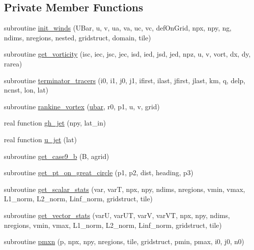 \subsection*{Private Member Functions}
\begin{DoxyCompactItemize}
\item 
subroutine \hyperlink{classtest__cases__mod_a6d5f8da880760736fb68b113be23efaf}{init\-\_\-winds} (U\-Bar, u, v, ua, va, uc, vc, def\-On\-Grid, npx, npy, ng, ndims, nregions, nested, gridstruct, domain, tile)
\item 
subroutine \hyperlink{classtest__cases__mod_afc2b5224f950494c9614172941aa7b6d}{get\-\_\-vorticity} (isc, iec, jsc, jec, isd, ied, jsd, jed, npz, u, v, vort, dx, dy, rarea)
\item 
subroutine \hyperlink{classtest__cases__mod_af4f0860ebee67f529c4151ae2957df42}{terminator\-\_\-tracers} (i0, i1, j0, j1, ifirst, ilast, jfirst, jlast, km, q, delp, ncnst, lon, lat)
\item 
subroutine \hyperlink{classtest__cases__mod_a6dea8865194b1c32a2d18f02b3c6533a}{rankine\-\_\-vortex} (\hyperlink{classtest__cases__mod_a3511ba6fb2dcfd0c5575f0568a060924}{ubar}, r0, p1, u, v, grid)
\item 
real function \hyperlink{classtest__cases__mod_a139f8e15372d168090bb8f90be687f48}{gh\-\_\-jet} (npy, lat\-\_\-in)
\item 
real function \hyperlink{classtest__cases__mod_ac1b81c67a4a1dd8cea8887368d0924f5}{u\-\_\-jet} (lat)
\item 
subroutine \hyperlink{classtest__cases__mod_a7203b08bdb8075134170d36306c5d7ff}{get\-\_\-case9\-\_\-b} (B, agrid)
\item 
subroutine \hyperlink{classtest__cases__mod_a823975b05ca9260a7efa6b923406a83d}{get\-\_\-pt\-\_\-on\-\_\-great\-\_\-circle} (p1, p2, dist, heading, p3)
\item 
subroutine \hyperlink{classtest__cases__mod_a62f965d866798b41c1a2ee3990a3ec59}{get\-\_\-scalar\-\_\-stats} (var, var\-T, npx, npy, ndims, nregions, vmin, vmax, L1\-\_\-norm, L2\-\_\-norm, Linf\-\_\-norm, gridstruct, tile)
\item 
subroutine \hyperlink{classtest__cases__mod_a648faf77090f422e584179d9f24fc54a}{get\-\_\-vector\-\_\-stats} (var\-U, var\-U\-T, var\-V, var\-V\-T, npx, npy, ndims, nregions, vmin, vmax, L1\-\_\-norm, L2\-\_\-norm, Linf\-\_\-norm, gridstruct, tile)
\item 
subroutine \hyperlink{classtest__cases__mod_a2716d53d4033232fcd71b57d74eaeb94}{pmxn} (p, npx, npy, nregions, tile, gridstruct, pmin, pmax, i0, j0, n0)

\end{DoxyCompactItemize}
